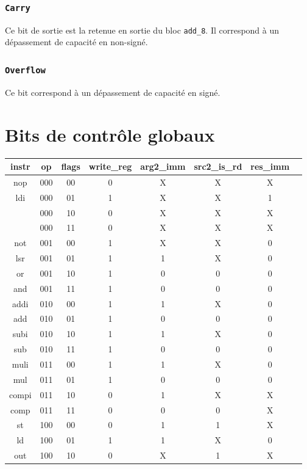 \documentclass[11pt, a4paper, twoside, titlepage]{article}
\begin{document}
\subsubsection{\texttt{Carry}}
Ce bit de sortie est la retenue en sortie du bloc \texttt{add\_8}. Il correspond à un dépassement de capacité en non-signé.

\subsubsection{\texttt{Overflow}}
Ce bit correspond à un dépassement de capacité en signé.

\section{Bits de contrôle globaux}
\begin{center}
	\ttfamily
	\begin{tabular}{|c|c|c|c|c|c|c|c|}
		\hline
		instr	& op & flags & write\_reg & arg2\_imm & src2\_is\_rd & res\_imm \\
		\hline
		nop		& 000 & 00 & 0 & X & X & X \\
		ldi		& 000 & 01 & 1 & X & X & 1 \\
				& 000 & 10 & 0 & X & X & X \\
				& 000 & 11 & 0 & X & X & X \\
		\hline
		not		& 001 & 00 & 1 & X & X & 0 \\
		lsr		& 001 & 01 & 1 & 1 & X & 0 \\
		or		& 001 & 10 & 1 & 0 & 0 & 0 \\
		and		& 001 & 11 & 1 & 0 & 0 & 0 \\
		\hline
		addi	& 010 & 00 & 1 & 1 & X & 0 \\
		add		& 010 & 01 & 1 & 0 & 0 & 0 \\
		subi	& 010 & 10 & 1 & 1 & X & 0 \\
		sub		& 010 & 11 & 1 & 0 & 0 & 0 \\
		\hline
		muli	& 011 & 00 & 1 & 1 & X & 0 \\
		mul		& 011 & 01 & 1 & 0 & 0 & 0 \\
		compi	& 011 & 10 & 0 & 1 & X & X \\
		comp	& 011 & 11 & 0 & 0 & 0 & X \\
		\hline
		st		& 100 & 00 & 0 & 1 & 1 & X \\
		ld		& 100 & 01 & 1 & 1 & X & 0 \\
		out		& 100 & 10 & 0 & X & 1 & X \\

\end{tabular}
\end{center}
\end{document}
